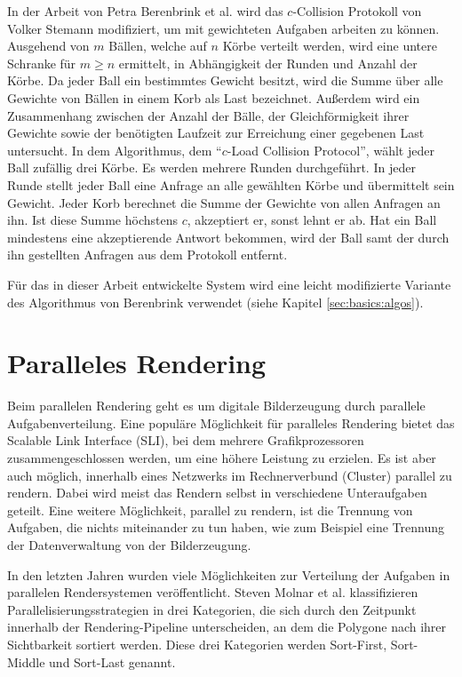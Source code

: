 In der Arbeit von Petra Berenbrink et al. wird das $c$-Collision Protokoll von Volker Stemann modifiziert, um mit gewichteten Aufgaben arbeiten zu können. Ausgehend von $m$ Bällen, welche auf $n$ Körbe verteilt werden, wird eine untere Schranke für $m \ge n$ ermittelt, in Abhängigkeit der Runden und Anzahl der Körbe. Da jeder Ball ein bestimmtes Gewicht besitzt, wird die Summe über alle Gewichte von Bällen in einem Korb als Last bezeichnet. Außerdem wird ein Zusammenhang zwischen der Anzahl der Bälle, der Gleichförmigkeit ihrer Gewichte sowie der benötigten Laufzeit zur Erreichung einer gegebenen Last untersucht. In dem Algorithmus, dem "`$c$-Load Collision Protocol"', wählt jeder Ball zufällig drei Körbe. Es werden mehrere Runden durchgeführt. In jeder Runde stellt jeder Ball eine Anfrage an alle gewählten Körbe und übermittelt sein Gewicht. Jeder Korb berechnet die Summe der Gewichte von allen Anfragen an ihn. Ist diese Summe höchstens $c$, akzeptiert er, sonst lehnt er ab. Hat ein Ball mindestens eine akzeptierende Antwort bekommen, wird der Ball samt der durch ihn gestellten Anfragen aus dem Protokoll entfernt.


Für das in dieser Arbeit entwickelte System wird eine leicht modifizierte Variante des Algorithmus von Berenbrink verwendet (siehe Kapitel \ref{sec:basics:algos}).
\section{Paralleles Rendering}
\label{sec:relwork:parrender}
Beim parallelen Rendering geht es um digitale Bilderzeugung durch parallele Aufgabenverteilung. Eine populäre Möglichkeit für paralleles Rendering bietet das Scalable Link Interface (SLI), bei dem mehrere Grafikprozessoren zusammengeschlossen werden, um eine höhere Leistung zu erzielen. Es ist aber auch möglich, innerhalb eines Netzwerks im Rechnerverbund (Cluster) parallel zu rendern. Dabei wird meist das Rendern selbst in verschiedene Unteraufgaben geteilt. Eine weitere Möglichkeit, parallel zu rendern, ist die Trennung von Aufgaben, die nichts miteinander zu tun haben, wie zum Beispiel eine Trennung der Datenverwaltung von der Bilderzeugung.


In den letzten Jahren wurden viele Möglichkeiten zur Verteilung der Aufgaben in parallelen Rendersystemen veröffentlicht. Steven Molnar et al. klassifizieren Parallelisierungsstrategien in drei Kategorien, die sich durch den Zeitpunkt innerhalb der Rendering-Pipeline unterscheiden, an dem die Polygone nach ihrer Sichtbarkeit sortiert werden. Diese drei Kategorien werden Sort-First, Sort-Middle und Sort-Last genannt.

